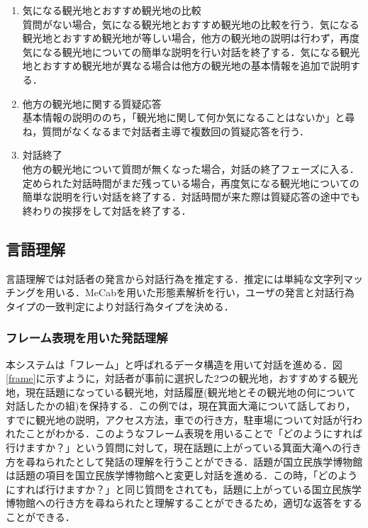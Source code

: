 \begin{enumerate}
    \item 気になる観光地とおすすめ観光地の比較\\
            質問がない場合，気になる観光地とおすすめ観光地の比較を行う．気になる観光地とおすすめ観光地が等しい場合，他方の観光地の説明は行わず，再度気になる観光地についての簡単な説明を行い対話を終了する．気になる観光地とおすすめ観光地が異なる場合は他方の観光地の基本情報を追加で説明する．

    \item 他方の観光地に関する質疑応答\\
            基本情報の説明ののち，「観光地に関して何か気になることはないか」と尋ね，質問がなくなるまで対話者主導で複数回の質疑応答を行う．

    \item 対話終了\\
            他方の観光地について質問が無くなった場合，対話の終了フェーズに入る．定められた対話時間がまだ残っている場合，再度気になる観光地についての簡単な説明を行い対話を終了する．対話時間が来た際は質疑応答の途中でも終わりの挨拶をして対話を終了する．
 \end{enumerate}

 \subsection{言語理解}
 言語理解では対話者の発言から対話行為を推定する．推定には単純な文字列マッチングを用いる．MeCabを用いた形態素解析を行い，ユーザの発言と対話行為タイプの一致判定により対話行為タイプを決める．

\subsubsection{フレーム表現を用いた発話理解}
本システムは「フレーム」と呼ばれるデータ構造を用いて対話を進める．図\ref{frame}に示すように，対話者が事前に選択した2つの観光地，おすすめする観光地，現在話題になっている観光地，対話履歴(観光地とその観光地の何について対話したかの組)を保持する．この例では，現在箕面大滝について話しており，すでに観光地の説明，アクセス方法，車での行き方，駐車場について対話が行われたことがわかる．このようなフレーム表現を用いることで「どのようにすれば行けますか？」という質問に対して，現在話題に上がっている箕面大滝への行き方を尋ねられたとして発話の理解を行うことができる．話題が国立民族学博物館は話題の項目を国立民族学博物館へと変更し対話を進める．この時，「どのようにすれば行けますか？」と同じ質問をされても，話題に上がっている国立民族学博物館への行き方を尋ねられたと理解することができるため，適切な返答をすることができる．

